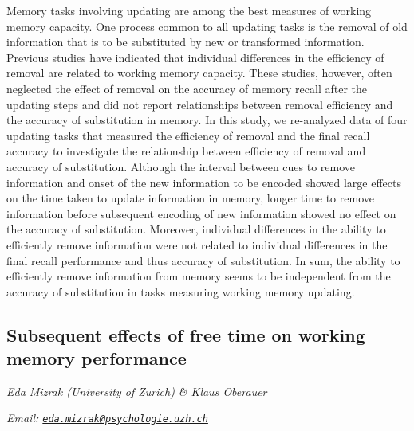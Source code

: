 \documentclass[12pt,]{book}
\begin{document}
Memory tasks involving updating are among the best measures of working memory capacity. One process common to all updating tasks is the removal of old information that is to be substituted by new or transformed information. Previous studies have indicated that individual differences in the efficiency of removal are related to working memory capacity. These studies, however, often neglected the effect of removal on the accuracy of memory recall after the updating steps and did not report relationships between removal efficiency and the accuracy of substitution in memory. In this study, we re-analyzed data of four updating tasks that measured the efficiency of removal and the final recall accuracy to investigate the relationship between efficiency of removal and accuracy of substitution. Although the interval between cues to remove information and onset of the new information to be encoded showed large effects on the time taken to update information in memory, longer time to remove information before subsequent encoding of new information showed no effect on the accuracy of substitution. Moreover, individual differences in the ability to efficiently remove information were not related to individual differences in the final recall performance and thus accuracy of substitution. In sum, the ability to efficiently remove information from memory seems to be independent from the accuracy of substitution in tasks measuring working memory updating.

\hypertarget{subsequent-effects-of-free-time-on-working-memory-performance}{%
\subsection{Subsequent effects of free time on working memory performance}\label{subsequent-effects-of-free-time-on-working-memory-performance}}

\emph{Eda Mizrak (University of Zurich) \& Klaus Oberauer}

\emph{Email: \href{mailto:eda.mizrak@psychologie.uzh.ch}{\nolinkurl{eda.mizrak@psychologie.uzh.ch}}}
\end{document}
